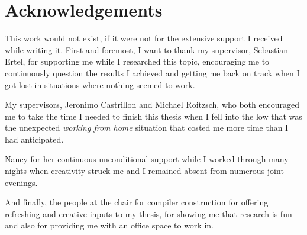 %
\chapter*{Acknowledgements}
\label{sec:acknowledgements}

This work would not exist, if it were not for the extensive support I received while writing it.
First and foremost, I want to thank my supervisor, Sebastian Ertel, for supporting me while I researched this topic, encouraging me to continuously question the results I achieved and getting me back on track when I got lost in situations where nothing seemed to work.

My supervisors, Jeronimo Castrillon and Michael Roitzsch, who both encouraged me to take the time I needed to finish this thesis when I fell into the low that was the unexpected \emph{working from home} situation that costed me more time than I had anticipated.

Nancy for her continuous unconditional support while I worked through many nights when creativity struck me and I remained absent from numerous joint evenings.

And finally, the people at the chair for compiler construction for offering refreshing and creative inputs to my thesis, for showing me that research is fun and also for providing me with an office space to work in.
